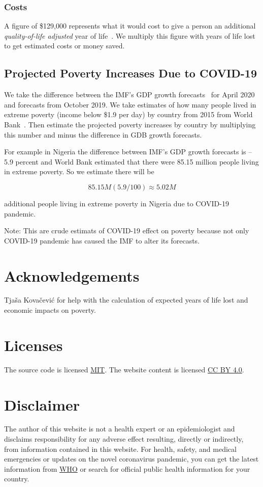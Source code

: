 \documentclass[12pt]{article}
\begin{document}
\subsubsection*{Costs}
A figure of \$129,000 represents what it would cost to give a person an additional {\it quality-of-life adjusted} year of life~\cite{price}. We multiply this figure with years of life lost to get estimated costs or money saved.

\subsection*{Projected Poverty Increases Due to COVID-19}
We take the difference between the IMF's GDP growth forecasts~\cite{IMF} for April 2020 and forecasts from October 2019. We take estimates of how many people lived in extreme poverty (income below \$1.9 per day) by country from 2015 from World Bank~\cite{worldbank}. Then estimate the projected poverty increases by country by multiplying this number and minus the difference in GDB growth forecasts.

For example in Nigeria the difference between IMF's GDP growth forecasts is –5.9 percent and World Bank estimated that there were 85.15 million people living in extreme poverty. So we estimate there will be 

\begin{equation*}
	85.15M (5.9 / 100) \approx 5.02M
\end{equation*}

additional people living in extreme poverty in Nigeria due to COVID-19 pandemic.

Note: This are crude estimats of COVID-19 effect on poverty because not only COVID-19 pandemic has caused the IMF to alter its forecasts.

\section*{Acknowledgements}
Tjaša Kovačević for help with the calculation of expected years of life lost and economic impacts on poverty.

\section*{Licenses}
The source code is licensed \href{http://opensource.org/licenses/mit-license.php}{MIT}. The website content is licensed \href{https://creativecommons.org/licenses/by/4.0/deed.ast}{CC BY 4.0}.


\section*{Disclaimer}
The author of this website is not a health expert or an epidemiologist and disclaims responsibility for any adverse effect resulting, directly or indirectly, from information contained in this website. For health, safety, and medical emergencies or updates on the novel coronavirus pandemic, you can get the latest information from \href{https://www.who.int/emergencies/diseases/novel-coronavirus-2019}{WHO} or search for official public health information for your country.



\end{document}
